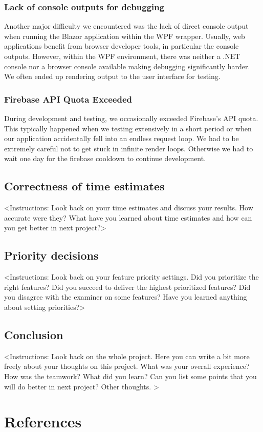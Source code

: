\documentclass{article}
\begin{document}
\subsubsection{Lack of console outputs for debugging}
Another major difficulty we encountered was the lack of direct console output when running the Blazor application within the WPF wrapper.
Usually, web applications benefit from browser developer tools, in particular the console outputs.
However, within the WPF environment, there was neither a .NET console nor a browser console available making debugging significantly harder.
We often ended up rendering output to the user interface for testing.

\subsubsection{Firebase API Quota Exceeded}
During development and testing, we occasionally exceeded Firebase's API quota.
This typically happened when we testing extensively in a short period or when our application accidentally fell into an endless request loop.
We had to be extremely careful not to get stuck in infinite render loops.
Otherwise we had to wait one day for the firebase cooldown to continue development.

\subsection{Correctness of time estimates}
<Instructions: Look back on your time estimates and discuss your results. How accurate were they? What have you learned about time estimates and how can you get better in next project?>

\subsection{Priority decisions}
<Instructions: Look back on your feature priority settings. Did you prioritize the right features? Did you succeed to deliver the highest prioritized features? Did you disagree with the examiner on some features? Have you learned anything about setting priorities?>

\subsection{Conclusion}
<Instructions: Look back on the whole project. Here you can write a bit more freely about your thoughts on this project. What was your overall experience? How was the teamwork? What did you learn? Can you list some points that you will do better in next project? Other thoughts. >

\clearpage

\section{References}
\printbibliography[heading=none]
\end{document}
